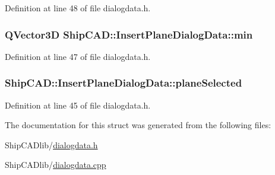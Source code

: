 Definition at line 48 of file dialogdata.\+h.

\subsubsection[{\texorpdfstring{min}{min}}]{\setlength{\rightskip}{0pt plus 5cm}Q\+Vector3D Ship\+C\+A\+D\+::\+Insert\+Plane\+Dialog\+Data\+::min}\hypertarget{structShipCAD_1_1InsertPlaneDialogData_a27431ce232112ee8c3c01cdc5eaba7fd}{}\label{structShipCAD_1_1InsertPlaneDialogData_a27431ce232112ee8c3c01cdc5eaba7fd}


Definition at line 47 of file dialogdata.\+h.

\subsubsection[{\texorpdfstring{plane\+Selected}{planeSelected}}]{ Ship\+C\+A\+D\+::\+Insert\+Plane\+Dialog\+Data\+::plane\+Selected}\hypertarget{structShipCAD_1_1InsertPlaneDialogData_aa028c61547384932261d4a8b647f9eeb}{}\label{structShipCAD_1_1InsertPlaneDialogData_aa028c61547384932261d4a8b647f9eeb}


Definition at line 45 of file dialogdata.\+h.



The documentation for this struct was generated from the following files\+:\begin{DoxyCompactItemize}
\item 
Ship\+C\+A\+Dlib/\hyperlink{dialogdata_8h}{dialogdata.\+h}\item 
Ship\+C\+A\+Dlib/\hyperlink{dialogdata_8cpp}{dialogdata.\+cpp}\end{DoxyCompactItemize}
